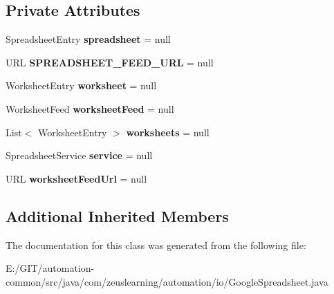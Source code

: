\subsection*{Private Attributes}
\begin{DoxyCompactItemize}
\item 
\hypertarget{classcom_1_1zeuslearning_1_1automation_1_1io_1_1GoogleSpreadsheet_aa53114e51f45bf5c08d11db763c265fd}{}\label{classcom_1_1zeuslearning_1_1automation_1_1io_1_1GoogleSpreadsheet_aa53114e51f45bf5c08d11db763c265fd} 
Spreadsheet\+Entry {\bfseries spreadsheet} = null
\item 
\hypertarget{classcom_1_1zeuslearning_1_1automation_1_1io_1_1GoogleSpreadsheet_abe46a82c45cdfedda1fe34d8aef84db1}{}\label{classcom_1_1zeuslearning_1_1automation_1_1io_1_1GoogleSpreadsheet_abe46a82c45cdfedda1fe34d8aef84db1} 
U\+RL {\bfseries S\+P\+R\+E\+A\+D\+S\+H\+E\+E\+T\+\_\+\+F\+E\+E\+D\+\_\+\+U\+RL} = null
\item 
\hypertarget{classcom_1_1zeuslearning_1_1automation_1_1io_1_1GoogleSpreadsheet_a9f3ed80200658929cf605a84b498a9c7}{}\label{classcom_1_1zeuslearning_1_1automation_1_1io_1_1GoogleSpreadsheet_a9f3ed80200658929cf605a84b498a9c7} 
Worksheet\+Entry {\bfseries worksheet} = null
\item 
\hypertarget{classcom_1_1zeuslearning_1_1automation_1_1io_1_1GoogleSpreadsheet_aba49a39e3914330f738546a34631d4e4}{}\label{classcom_1_1zeuslearning_1_1automation_1_1io_1_1GoogleSpreadsheet_aba49a39e3914330f738546a34631d4e4} 
Worksheet\+Feed {\bfseries worksheet\+Feed} = null
\item 
\hypertarget{classcom_1_1zeuslearning_1_1automation_1_1io_1_1GoogleSpreadsheet_a344c3aaafbcbdf6fbee91b80ba77004d}{}\label{classcom_1_1zeuslearning_1_1automation_1_1io_1_1GoogleSpreadsheet_a344c3aaafbcbdf6fbee91b80ba77004d} 
List$<$ Worksheet\+Entry $>$ {\bfseries worksheets} = null
\item 
\hypertarget{classcom_1_1zeuslearning_1_1automation_1_1io_1_1GoogleSpreadsheet_ad42b098193d6ee6798b6b65347fbc640}{}\label{classcom_1_1zeuslearning_1_1automation_1_1io_1_1GoogleSpreadsheet_ad42b098193d6ee6798b6b65347fbc640} 
Spreadsheet\+Service {\bfseries service} = null
\item 
\hypertarget{classcom_1_1zeuslearning_1_1automation_1_1io_1_1GoogleSpreadsheet_aef25f89a8d301d77d1674512a787fb34}{}\label{classcom_1_1zeuslearning_1_1automation_1_1io_1_1GoogleSpreadsheet_aef25f89a8d301d77d1674512a787fb34} 
U\+RL {\bfseries worksheet\+Feed\+Url} = null
\end{DoxyCompactItemize}
\subsection*{Additional Inherited Members}


The documentation for this class was generated from the following file\+:\begin{DoxyCompactItemize}
\item 
E\+:/\+G\+I\+T/automation-\/common/src/java/com/zeuslearning/automation/io/Google\+Spreadsheet.\+java\end{DoxyCompactItemize}
